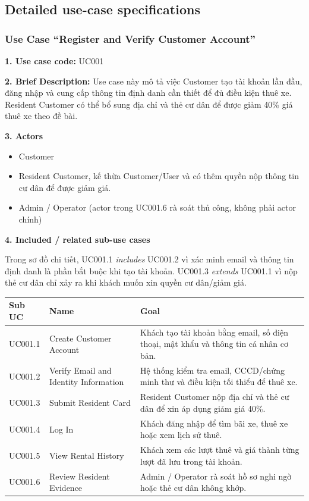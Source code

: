 \subsection{Detailed use-case specifications}

\subsubsection{Use Case ``Register and Verify Customer Account''}

\textbf{1. Use case code:} UC001

\textbf{2. Brief Description:} Use case này mô tả việc Customer tạo tài khoản lần
đầu, đăng nhập và cung cấp thông tin định danh cần thiết để đủ điều kiện thuê xe.
Resident Customer có thể bổ sung địa chỉ và thẻ cư dân để được giảm 40\% giá thuê
xe theo đề bài.

\textbf{3. Actors}
\begin{itemize}
  \item Customer
  \item Resident Customer, kế thừa Customer/User và có thêm quyền nộp thông tin cư dân để được giảm giá.
  \item Admin / Operator (actor trong UC001.6 rà soát thủ công, không phải actor chính)
\end{itemize}

\textbf{4. Included / related sub-use cases}

Trong sơ đồ chi tiết, UC001.1 \textit{includes} UC001.2 vì xác minh email và
thông tin định danh là phần bắt buộc khi tạo tài khoản. UC001.3
\textit{extends} UC001.1 vì nộp thẻ cư dân chỉ xảy ra khi khách muốn xin quyền
cư dân/giảm giá.

\begin{longtable}{P{0.18\textwidth}P{0.30\textwidth}P{0.42\textwidth}}
\toprule
\textbf{Sub UC} & \textbf{Name} & \textbf{Goal} \\
\midrule
UC001.1 & Create Customer Account & Khách tạo tài khoản bằng email, số điện thoại, mật khẩu và thông tin cá nhân cơ bản. \\
UC001.2 & Verify Email and Identity Information & Hệ thống kiểm tra email, CCCD/chứng minh thư và điều kiện tối thiểu để thuê xe. \\
UC001.3 & Submit Resident Card & Resident Customer nộp địa chỉ và thẻ cư dân để xin áp dụng giảm giá 40\%. \\
UC001.4 & Log In & Khách đăng nhập để tìm bãi xe, thuê xe hoặc xem lịch sử thuê. \\
UC001.5 & View Rental History & Khách xem các lượt thuê và giá thành từng lượt đã lưu trong tài khoản. \\
UC001.6 & Review Resident Evidence & Admin / Operator rà soát hồ sơ nghi ngờ hoặc thẻ cư dân không khớp. \\
\bottomrule
\end{longtable}

